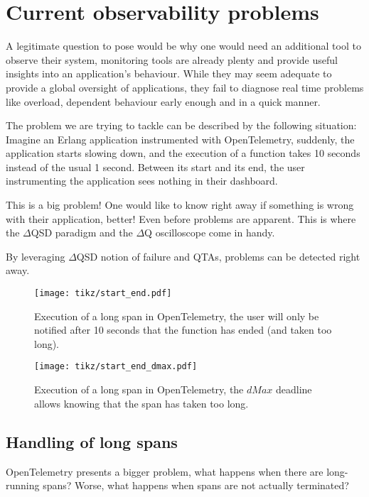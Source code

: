 \section{Current observability problems}

    A legitimate question to pose would be why one would need an additional tool to observe their system, monitoring tools are already plenty and provide useful insights into an application's behaviour. While they may seem adequate to provide a global oversight of applications, they fail to diagnose real time problems like overload, dependent behaviour early enough and in a quick manner.

    The problem we are trying to tackle can be described by the following situation: 
    Imagine an Erlang application instrumented with OpenTelemetry, suddenly, the application starts slowing down, and the execution of a function takes 10 seconds instead of the usual 1 second. Between its start and its end, the user instrumenting the application sees nothing in their dashboard.
    
    This is a big problem! One would like to know right away if something is wrong with their application, better! Even before problems are apparent. This is where the $\Delta$QSD paradigm and the $\Delta$Q oscilloscope come in handy.
   
   By leveraging $\Delta$QSD notion of failure and QTAs, problems can be detected right away. 
    
    \begin{figure}[H]
        \begin{center}
            \texttt{[image: tikz/start\_end.pdf]}
        \end{center}
        \caption{Execution of a long span in OpenTelemetry, the user will only be notified after 10 seconds that the function has ended (and taken too long).}
    \end{figure}

    \begin{figure}[H]
        \begin{center}
            \texttt{[image: tikz/start\_end\_dmax.pdf]}
        \end{center}
        \caption{Execution of a long span in OpenTelemetry, the $dMax$ deadline allows knowing that the span has taken too long.}
        \label{fig:otel_dmax}
    \end{figure} 


    \subsection{Handling of long spans}
        OpenTelemetry presents a bigger problem, what happens when there are long-running spans? Worse, what happens when spans are not actually terminated?
        
